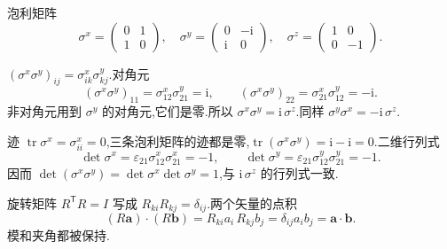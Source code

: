 \begin{example}
泡利矩阵
\begin{equation}
  \sigma^x=\begin{pmatrix}0&1\\1&0\end{pmatrix},\quad
  \sigma^y=\begin{pmatrix}0&-\mathrm{i}\\\mathrm{i}&0\end{pmatrix},\quad
  \sigma^z=\begin{pmatrix}1&0\\0&-1\end{pmatrix}.
\end{equation}
\end{example}
\begin{solution}
$(\sigma^x\sigma^y)_{ij}=\sigma^x_{ik}\sigma^y_{kj}$.对角元
\begin{equation}
  (\sigma^x\sigma^y)_{11}=\sigma^x_{12}\sigma^y_{21}=\mathrm{i},
  \qquad
  (\sigma^x\sigma^y)_{22}=\sigma^x_{21}\sigma^y_{12}=-\mathrm{i}.
\end{equation}
非对角元用到 $\sigma^y$ 的对角元,它们是零.所以 $\sigma^x\sigma^y=\mathrm{i}\,\sigma^z$.同样 $\sigma^y\sigma^x=-\mathrm{i}\,\sigma^z$.

迹 $\operatorname{tr}\sigma^x=\sigma^x_{ii}=0$,三条泡利矩阵的迹都是零,$\operatorname{tr}(\sigma^x\sigma^y)=\mathrm{i}-\mathrm{i}=0$.二维行列式
\begin{equation}
  \det\sigma^x=\varepsilon_{21}\sigma^x_{12}\sigma^x_{21}=-1,
  \qquad
  \det\sigma^y=\varepsilon_{21}\sigma^y_{12}\sigma^y_{21}=-1.
\end{equation}
因而 $\det(\sigma^x\sigma^y)=\det\sigma^x\det\sigma^y=1$,与 $\mathrm{i}\,\sigma^z$ 的行列式一致.
\end{solution}

旋转矩阵 $R^{\mathsf T}R=I$ 写成 $R_{ki}R_{kj}=\delta_{ij}$.两个矢量的点积
\begin{equation}
  (R\mathbf{a})\cdot(R\mathbf{b})=R_{ki}a_i\,R_{kj}b_j=\delta_{ij}a_i b_j=\mathbf{a}\cdot\mathbf{b}.
\end{equation}
模和夹角都被保持.
